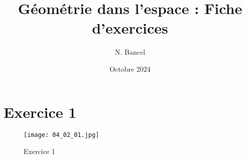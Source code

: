 \documentclass[a4paper,12pt]{article}
\begin{document}
\title{Géométrie dans l'espace : Fiche d'exercices}
\author{N. Bancel}
\date{Octobre 2024}

\maketitle

\section{Exercice 1}

\begin{figure}[H]
  \centering
  \texttt{[image: 04\_02\_01.jpg]}
  \caption{Exercice 1}
\end{figure}
\end{document}
